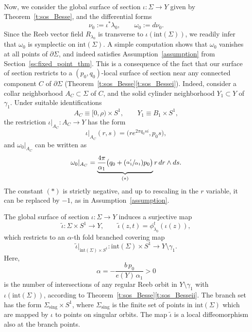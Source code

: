 \documentclass[JEP,XML,SOM,Unicode,published]{cedram}
\newcommand{\Psfrac}[2]{(\sfrac{#1}{#2})}
\theoremstyle{definition}
\let\eul e
\let\diff d
\begin{document}
Now, we consider the global surface of section $\iota:\Sigma\to Y$ given by Theorem~\ref{t:sos_Besse}, and the differential forms
\[
\nu_0:=\iota^*\lambda_0,
\qquad
\omega_0:=\diff\nu_0.
\]
Since the Reeb vector field $R_{\lambda_0}$ is transverse to $\iota(\mathrm{int}(\Sigma))$, we readily infer that $\omega_0$ is symplectic on $\mathrm{int}(\Sigma)$. A simple computation shows that $\omega_0$ vanishes at all points of $\partial\Sigma$, and indeed satisfies Assumption~\ref{assumption} from Section~\ref{ss:fixed_point_thm}. This is a consequence of the fact that our surface of section restricts to a $(p_0,q_0)$-local surface of section near any connected component $C$ of $\partial\Sigma$ (Theorem~\ref{t:sos_Besse}\eqref{t:sos_Bessei}). Indeed, consider a collar neighborhood $A_C\subset \Sigma$ of $C$, and the solid cylinder neighborhood $Y_1\subset Y$ of $\gamma_1$. Under suitable identifications
\[
A_C\equiv [0,\rho)\times S^1,\qquad Y_1\equiv B_1\times S^1,
\]
the restriction $\iota|_{A_C}:A_C\to Y$ has the form
\[
\iota|_{A_C}(r,s)=\big( r e^{2\pi q_0 s i},p_0s \big),
\]
and $\omega_0|_{A_C}$ can be written as
\begin{equation}
\label{e:omega_0_annulus}
\omega_0|_{A_C}
=
\underbrace{\frac{4\pi}{\alpha_1} \big( q_0+\Psfrac{\alpha_1'}{\alpha_1}p_0\big)}_{(*)} r\,\diff r\wedge\diff s.
\end{equation}
The constant $(*)$ is strictly negative, and up to rescaling in the $r$ variable, it can be replaced by $-1$, as in Assumption~\ref{assumption}.

The global surface of section $\iota:\Sigma\to Y$ induces a surjective map
\[
\tilde \iota:\Sigma\times S^1\to Y,\qquad \tilde\iota(z,t)=\phi_{\lambda_0}^t(\iota(z)),
\]
which restricts to an $\alpha$-th fold branched covering map
\begin{equation}
\label{e:alpha_covering_map}
\tilde \iota|_{\mathrm{int}(\Sigma)\times S^1}:\mathrm{int}(\Sigma)\times S^1\to Y\setminus\gamma_1.
\end{equation}
Here,
\[
\alpha=- \frac{b\, p_0}{\eul(Y)\, \alpha_1}>0
\]
is the number of intersections of any regular Reeb orbit in $Y\setminus\gamma_1$ with $\iota(\mathrm{int}(\Sigma))$, according to Theorem~\ref{t:sos_Besse}\eqref{t:sos_Besseii}. The branch set has the form $\Sigma_{\mathrm{sing}}\times S^1$, where $\Sigma_{\mathrm{sing}}$ is the finite set of points in $\mathrm{int}(\Sigma)$ which are mapped by $\iota$ to points on singular orbits. The map $\tilde\iota$ is a local diffeomorphism also at the branch points.
\end{document}
